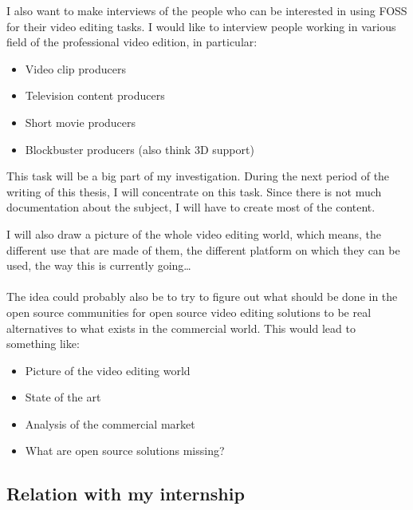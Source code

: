       I also want to make interviews of the people who can be interested in
      using FOSS for their video editing tasks. I would like to interview
      people working in various field of the professional video edition,
      in particular:
      \begin{itemize}
        \item {Video clip producers}
        \item {Television content producers}
        \item {Short movie producers}
        \item {Blockbuster producers (also think 3D support)}
      \end{itemize}
      This task will be a big part of my investigation. During the next period
      of the writing of this thesis, I will concentrate on this task. Since
      there is not much documentation about the subject, I will have to create
      most of the content.

      I will also draw a picture of the whole video editing world, which
      means, the different use that are made of them, the different platform on which
      they can be used, the way this is currently going\ldots

  \paragraph{}
    The idea could probably also be to try to figure out what should be done
    in the open source communities for open source video editing solutions
    to be real alternatives to what exists in the commercial world. This
    would lead to something like:
    \begin {itemize}
      \item{Picture of the video editing world}
      \item{State of the art}
      \item{Analysis of the commercial market}
      \item{What are open source solutions missing?}
    \end{itemize}

\subsection{Relation with my internship}
